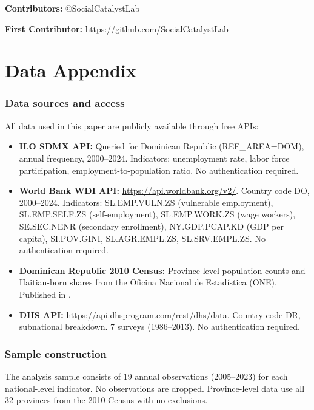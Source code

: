 \documentclass[12pt]{article}
\begin{document}
\noindent\textbf{Contributors:} @SocialCatalystLab

\noindent\textbf{First Contributor:} \url{https://github.com/SocialCatalystLab}

\label{apep_main_text_end}
\newpage


\newpage
\appendix

\section{Data Appendix}

\subsubsection*{Data sources and access}
All data used in this paper are publicly available through free APIs:

\begin{itemize}
\item \textbf{ILO SDMX API:} Queried for Dominican Republic (REF\_AREA=DOM), annual frequency, 2000--2024. Indicators: unemployment rate, labor force participation, employment-to-population ratio. No authentication required.

\item \textbf{World Bank WDI API:} \url{https://api.worldbank.org/v2/}. Country code DO, 2000--2024. Indicators: SL.EMP.VULN.ZS (vulnerable employment), SL.EMP.SELF.ZS (self-employment), SL.EMP.WORK.ZS (wage workers), SE.SEC.NENR (secondary enrollment), NY.GDP.PCAP.KD (GDP per capita), SI.POV.GINI, SL.AGR.EMPL.ZS, SL.SRV.EMPL.ZS. No authentication required.

\item \textbf{Dominican Republic 2010 Census:} Province-level population counts and Haitian-born shares from the Oficina Nacional de Estad\'{i}stica (ONE). Published in \citet{one2013eni}.

\item \textbf{DHS API:} \url{https://api.dhsprogram.com/rest/dhs/data}. Country code DR, subnational breakdown. 7 surveys (1986--2013). No authentication required.
\end{itemize}

\subsubsection*{Sample construction}
The analysis sample consists of 19 annual observations (2005--2023) for each national-level indicator. No observations are dropped. Province-level data use all 32 provinces from the 2010 Census with no exclusions.
\end{document}
